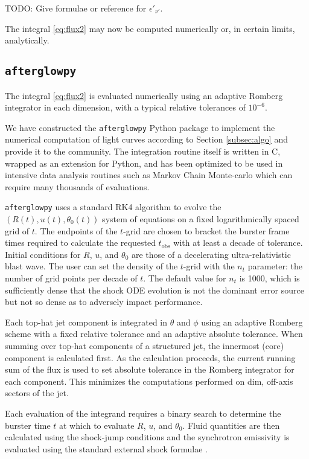 \documentclass[twocolumn]{aastex62}
\newcommand{\afterglowpy}{{\tt afterglowpy}}
\newcommand{\tobs}{\ensuremath{t_{\mathrm{obs}}}}
\begin{document}
TODO: Give formulae or reference for $\epsilon'_{\nu'}$.

The integral \eqref{eq:flux2} may now be computed numerically or, in certain limits, analytically.

\subsection{\afterglowpy{}} \label{subsec:afterglowpy}


The integral \eqref{eq:flux2} is evaluated numerically using an adaptive Romberg integrator in each dimension, with a typical relative tolerances of $10^{-6}$.  

We have constructed the \afterglowpy{} Python package to implement the numerical computation of light curves according to Section \ref{subsec:algo} and provide it to the community.  The integration routine itself is written in C, wrapped as an extension for Python, and has been optimized to be used in intensive data analysis routines such as Markov Chain Monte-carlo which can require many thousands of evaluations.  

\afterglowpy{} uses a standard RK4 algorithm to evolve the $(R(t), u(t), \theta_0(t))$ system of equations on a fixed logarithmically spaced grid of $t$.  The endpoints of the $t$-grid are chosen to bracket the burster frame times required to calculate the requested $\tobs$ with at least a decade of tolerance.  Initial conditions for $R$, $u$, and $\theta_0$ are those of a decelerating ultra-relativistic blast wave.  The user can set the density of the $t$-grid with the $n_t$ parameter: the number of grid points per decade of $t$.  The default value for $n_t$ is 1000, which is sufficiently dense that the shock ODE evolution is not the dominant error source but not so dense as to adversely impact performance.

Each top-hat jet component is integrated in $\theta$ and $\phi$ using an adaptive Romberg scheme with a fixed relative tolerance and an adaptive absolute tolerance.  When summing over top-hat components of a structured jet, the innermost (core) component is calculated first.  As the calculation proceeds, the current running sum of the flux is used to set absolute tolerance in the Romberg integrator for each component.  This minimizes the computations performed on dim, off-axis sectors of the jet.  

Each evaluation of the integrand requires a binary search to determine the burster time $t$ at which to evaluate $R$, $u$, and $\theta_0$.  Fluid quantities are then calculated using the shock-jump conditions and the synchrotron emissivity is evaluated using the standard external shock formulae \citep{Granot:2002aa,van-Eerten:2010aa}.  
\end{document}
